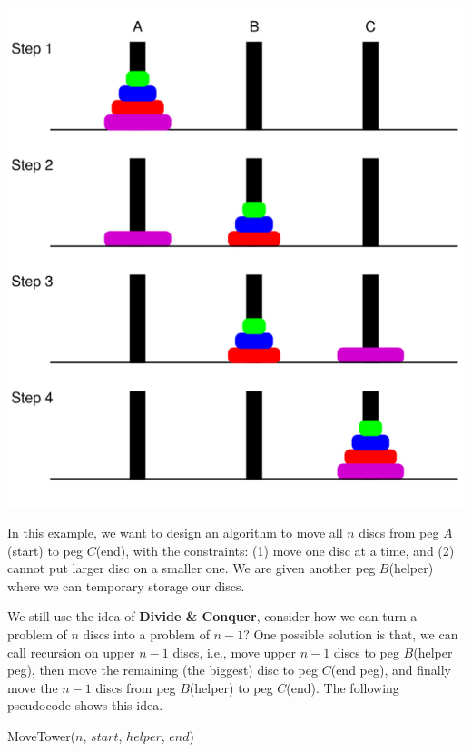 \documentclass[11pt, a4paper]{COMP3711}
\begin{document}
\begin{spacing}{1.5}
    \includegraphics[scale=0.28]{images/02-hanoi.jpeg}
    
    In this example, we want to design an algorithm to 
    move all $n$ discs from peg $A$(start) to peg $C$(end), with the 
    constraints: (1) move one disc at a time, and 
    (2) cannot put larger disc on a smaller one.
    We are given another peg $B$(helper) where we can 
    temporary storage our discs.

    We still use the idea of {\bf Divide \& Conquer},
    consider how we can turn a problem of $n$ discs 
    into a problem of $n-1$? One possible solution is that,
    we can call recursion on upper $n-1$ discs, i.e., 
    move upper $n-1$ discs to peg $B$(helper peg), then move the remaining
    (the biggest) disc to peg $C$(end peg), and finally 
    move the $n-1$ discs from peg $B$(helper) to peg $C$(end).
    The following pseudocode shows this idea.

    \begin{algorithm}
        \caption{MoveTower($n$, $start$, $helper$, $end$)}
\end{algorithm}
\end{spacing}
\end{document}
